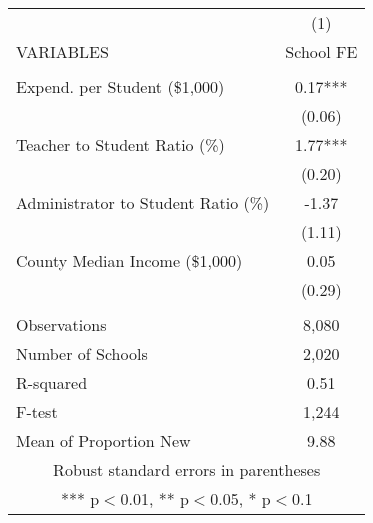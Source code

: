 \begin{tabular}{lc}
\hline\hline
 & (1) \\
VARIABLES & School FE \\ \hline
 &  \\
Expend. per Student (\$1,000) & 0.17*** \\
 & (0.06) \\
Teacher to Student Ratio (\%) & 1.77*** \\
 & (0.20) \\
Administrator to Student Ratio (\%) & -1.37 \\
 & (1.11) \\
County Median Income (\$1,000) & 0.05 \\
 & (0.29) \\
 &  \\
Observations & 8,080 \\
Number of Schools & 2,020 \\
R-squared & 0.51 \\
 F-test & 1,244 \\
 Mean of Proportion New & 9.88\\\hline\hline
\multicolumn{2}{c}{ Robust standard errors in parentheses} \\
\multicolumn{2}{c}{ *** p$<$0.01, ** p$<$0.05, * p$<$0.1} \\
\end{tabular}
